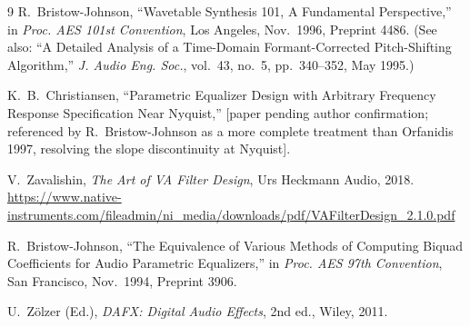 \documentclass[twoside,a4paper]{article}
\begin{document}
\begin{thebibliography}{9}
R.~Bristow-Johnson, ``Wavetable Synthesis 101, A Fundamental Perspective,''
in \textit{Proc. AES 101st Convention}, Los Angeles, Nov.\ 1996, Preprint 4486.
(See also: ``A Detailed Analysis of a Time-Domain Formant-Corrected
Pitch-Shifting Algorithm,'' \textit{J. Audio Eng. Soc.}, vol.~43, no.~5,
pp.~340--352, May 1995.)

K.~B.~Christiansen, ``Parametric Equalizer Design with Arbitrary Frequency
Response Specification Near Nyquist,'' [paper pending author confirmation;
referenced by R.~Bristow-Johnson as a more complete treatment than Orfanidis
1997, resolving the slope discontinuity at Nyquist].

V.~Zavalishin, \textit{The Art of VA Filter Design}, Urs Heckmann Audio, 2018.
\url{https://www.native-instruments.com/fileadmin/ni_media/downloads/pdf/VAFilterDesign_2.1.0.pdf}

R.~Bristow-Johnson, ``The Equivalence of Various Methods of Computing Biquad
Coefficients for Audio Parametric Equalizers,''
in \textit{Proc. AES 97th Convention}, San Francisco, Nov.\ 1994, Preprint 3906.

U.~Z{\"o}lzer (Ed.), \textit{DAFX: Digital Audio Effects}, 2nd ed.,
Wiley, 2011.
\end{thebibliography}
\end{document}
